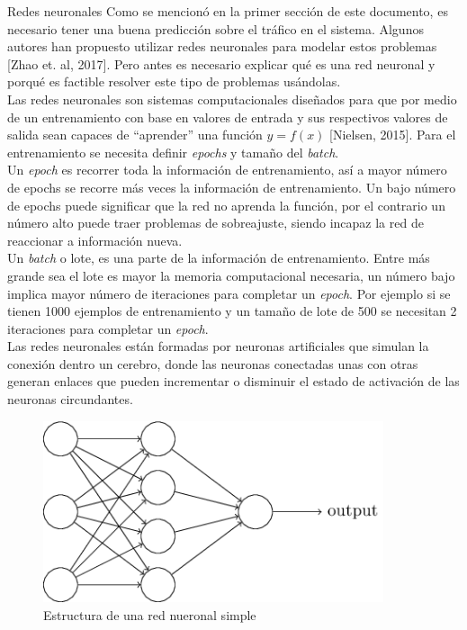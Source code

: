 \documentclass[12pt,spanish]{article}
\makeatletter
\newcounter{numberofruns}%
\newcommand{\secfig@@writecounterstage}{1}%
\newcommand{\secfig@@readcounterstage}{2}%
\newcommand{\secfig@@writecontentstage}{2}%
\newlength{\loftsectionbeforeskipamount}%
\newlength{\loftsectionafterskipamount}%
\newcommand{\loftsectionbeforeskip}{\vspace{\loftsectionbeforeskipamount}}%
\newcommand{\loftsectionafterskip}{\vspace{\loftsectionafterskipamount}}%
\newcounter{totalsections}
\let\LaTeXStandardSection\section%
\newcommand{\unstarredsection@@noopt}[1]{%
	\unstarredsection@@opt[#1]{#1}%
}%
\newcommand{\StoreCounterValue}[1]{%
	\immediate\expandafter\write\csname #1countsout\endcsname{%
		\number\value{#1}%
	}%
}%
\newcommand{\LoadAllStoredCounterValues}[1]{%
	\ifnumequal{\number\value{#1}}{\secfig@@readcounterstage}{%
		\read\figurecountsin to \lastsectionfigures
		\read\tablecountsin  to \lastsectiontables%
	}{}%
}%
\newcommand{\loftsectioncontentsline}[1]{%
	\loftsectionbeforeskip\textbf{\large\thesection~#1}\loftsectionafterskip
}%
\newcommand{\unstarredsection@@opt}[2][]{%
	\iftoggle{SectionsInLOFT}{%
		\FloatBarrier%
		\gdef\lastsectionfigures{0}%
		\gdef\lastsectiontables{0}%
		\ifnumequal{\number\value{numberofruns}}{\secfig@@writecounterstage}{%
			\gdef\lastsectionfigures{\number\value{figure}}%
			\gdef\lastsectionfigures{\number\value{table}}%
			\ifnumequal{\number\value{totalsections}}{0}{%
			}{%
				\StoreCounterValue{figure}%
				\StoreCounterValue{table}%
			}%
		}{%
			\LoadAllStoredCounterValues{numberofruns}%
		}%
	}{%
	}%
	\LaTeXStandardSection[#1]{#2}%
	\iftoggle{SectionsInLOFT}{%
		\ifnumequal{\number\value{numberofruns}}{\secfig@@writecontentstage}{%
			\ifnumgreater{\lastsectionfigures}{0}{%
				\typeout{Writing a section entry for \thesection{}to the LOF}%
				\iftoggle{AppendixSectionsInLOF}{%
					\addtocontents{lof}{\loftsectioncontentsline{#1}}%
				}{}%
			}{%
				\typeout{No figures in \thesection!}
			}%
			\ifnumgreater{\lastsectiontables}{0}{%
				\typeout{Writing a section entry for \thesection{}to the LOT}%
				\iftoggle{AppendixSectionsInLOT}{%
					\addtocontents{lot}{\loftsectioncontentsline{#1}}%
				}{}%
			}{%
				\typeout{No tables in \thesection!}
			}%
		}{}%
	}{%
	}%
}%
\newcommand{\unstarredsection}{%
	\@ifnextchar[{%
		\unstarredsection@@opt%
	}{%
		\unstarredsection@@noopt%
	}%
}%
\newcommand{\starredsection}[1]{%
	\LaTeXStandardSection*{#1}%
}%
\renewcommand{\section}{%
	\@ifstar{%
		\starredsection%
	}{%
		\unstarredsection%
	}%
}%
\makeatother
\begin{document}
	\section{Redes neuronales}
	Como se mencionó en la primer sección de este documento, es necesario tener una buena predicción sobre el tráfico en el sistema. Algunos autores han propuesto utilizar redes neuronales para modelar estos problemas [Zhao et. al, 2017]. Pero antes es necesario explicar qué es una red neuronal y porqué es factible resolver este tipo de problemas usándolas.\\
	Las redes neuronales son sistemas computacionales diseñados para que por medio de un entrenamiento con base en valores de entrada y sus respectivos valores de salida sean capaces de ``aprender'' una función $ y = f(x) $ [Nielsen, 2015]. Para el entrenamiento se necesita definir \textit{epochs} y tamaño del \textit{batch}.\\
	Un \textit{epoch} es recorrer toda la información de entrenamiento, así a mayor número de epochs se recorre más veces la información de entrenamiento. Un bajo número de epochs puede significar que la red no aprenda la función, por el contrario un número alto puede traer problemas de sobreajuste, siendo incapaz la red de reaccionar a información nueva.\\
	Un \textit{batch} o lote, es una parte de la información de entrenamiento. Entre más grande sea el lote es mayor la memoria computacional necesaria, un número bajo implica mayor número de iteraciones para completar un \textit{epoch}. Por ejemplo si se tienen 1000 ejemplos de entrenamiento y un tamaño de lote de 500 se necesitan 2 iteraciones para completar un \textit{epoch}.\\
	Las redes neuronales están formadas por neuronas artificiales que simulan la conexión dentro un cerebro, donde las neuronas conectadas unas con otras generan enlaces que pueden incrementar o disminuir el estado de activación de las neuronas circundantes. 
	\begin{figure}[H]
		\centering
		\includegraphics[width=10cm]{Imagenes/neural_network_structure.png}
		\begin{centering}
			\caption{Estructura de una red nueronal simple}
		\end{centering}
	\end{figure}
	
\end{document}
